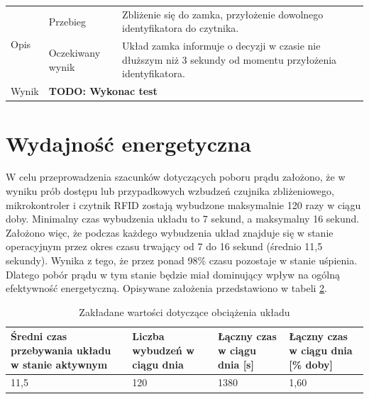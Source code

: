 \begin{table}[h!]
\begin{subtable}[c]{\textwidth}
\begin{tabular}{p{2cm}|p{}|p{}}
                    \multirow{2}{*}{Opis} & Przebieg           & Zbliżenie się do zamka, przyłożenie dowolnego identyfikatora do czytnika.  \\ \cline{2-3}
                                          & Oczekiwany wynik   & Układ zamka informuje o decyzji w czasie nie dłuższym niż 3 sekundy od momentu przyłożenia identyfikatora.                                                  \\ \hline
                    Wynik                 & \multicolumn{2}{p{12cm}}{\textbf{TODO: Wykonac test}} \\
                    \end{tabular}%
                \label{tbl:test6}
                \vspace{10mm}
            \end{subtable}
            \label{tbl:tests}
        \end{table}

    \pagebreak

    \section{Wydajność energetyczna}

        W celu przeprowadzenia szacunków dotyczących poboru prądu założono, że w wyniku prób dostępu lub przypadkowych wzbudzeń czujnika zbliżeniowego, mikrokontroler i czytnik RFID zostają wybudzone maksymalnie 120 razy w ciągu doby. Minimalny czas wybudzenia układu to 7 sekund, a maksymalny 16 sekund. Założono więc, że podczas każdego wybudzenia układ znajduje się w stanie operacyjnym przez okres czasu trwający od 7 do 16 sekund (średnio 11,5 sekundy). Wynika z tego, że przez ponad 98\% czasu pozostaje w stanie uśpienia. Dlatego pobór prądu w tym stanie będzie miał dominujący wpływ na ogólną efektywność energetyczną. Opisywane założenia przedstawiono w tabeli \ref{tbl:tab4}.

        \begin{table}[]
            \caption{Zakładane wartości dotyczące obciążenia układu}
            \centering
            \begin{tabular}{p{4cm}|p{3cm}|p{3cm}|p{3cm}}
                    \textbf{Średni czas przebywania układu w stanie aktywnym} & \textbf{Liczba wybudzeń w ciągu dnia} & \textbf{Łączny czas w ciągu dnia [s]} & \textbf{Łączny czas w ciągu dnia [\% doby]} \\ \hline
                     11,5 & 120 & 1380 & 1,60 \\
            \end{tabular}
            \label{tbl:tab4}
            \vspace{10mm}
        \end{table}

